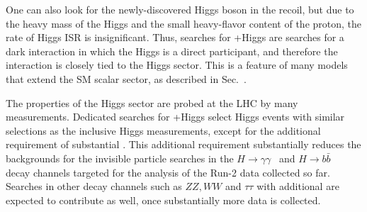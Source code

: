 
%


One can also look for the newly-discovered Higgs boson in the recoil, but due to the heavy mass of the Higgs and the small heavy-flavor content of the proton, the rate of Higgs ISR is insignificant. 
Thus, searches for \MET+Higgs are searches for a dark interaction in which the Higgs is a direct participant, and therefore the interaction is closely tied to the Higgs sector. 
This is a feature of many models that extend the SM scalar sector, as described in Sec.~\cite{sec:BSMMediatorModels}. 

The properties of the Higgs sector are probed at the LHC by many measurements. Dedicated searches for \MET+Higgs select Higgs events with similar selections as the inclusive Higgs measurements, except for the additional requirement of substantial \MET. This additional requirement substantially reduces the backgrounds for the invisible particle searches in the $H \rightarrow \gamma\gamma$~\cite{CMS-PAS-EXO-16-054,Aaboud:2017uak} and $H \rightarrow b\bar{b}$~\cite{Aaboud:2017yqz} decay channels targeted for the analysis of the Run-2 data collected so far. 
Searches in other decay channels such as $ZZ, WW$ and $\tau\tau$ with additional \MET are expected to contribute as well, once substantially more data is collected. 

